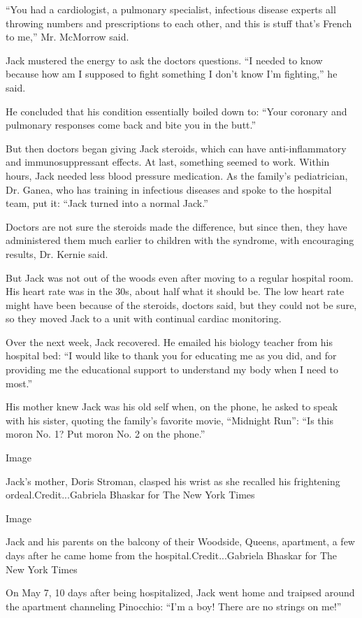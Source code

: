 ``You had a cardiologist, a pulmonary specialist, infectious disease
experts all throwing numbers and prescriptions to each other, and this
is stuff that's French to me,'' Mr. McMorrow said.

Jack mustered the energy to ask the doctors questions. ``I needed to
know because how am I supposed to fight something I don't know I'm
fighting,'' he said.

He concluded that his condition essentially boiled down to: ``Your
coronary and pulmonary responses come back and bite you in the butt.''

But then doctors began giving Jack steroids, which can have
anti-inflammatory and immunosuppressant effects. At last, something
seemed to work. Within hours, Jack needed less blood pressure
medication. As the family's pediatrician, Dr. Ganea, who has training in
infectious diseases and spoke to the hospital team, put it: ``Jack
turned into a normal Jack.''

Doctors are not sure the steroids made the difference, but since then,
they have administered them much earlier to children with the syndrome,
with encouraging results, Dr. Kernie said.

But Jack was not out of the woods even after moving to a regular
hospital room. His heart rate was in the 30s, about half what it should
be. The low heart rate might have been because of the steroids, doctors
said, but they could not be sure, so they moved Jack to a unit with
continual cardiac monitoring.

Over the next week, Jack recovered. He emailed his biology teacher from
his hospital bed: ``I would like to thank you for educating me as you
did, and for providing me the educational support to understand my body
when I need to most.''

His mother knew Jack was his old self when, on the phone, he asked to
speak with his sister, quoting the family's favorite movie, ``Midnight
Run'': ``Is this moron No. 1? Put moron No. 2 on the phone.''

Image

Jack's mother, Doris Stroman, clasped his wrist as she recalled his
frightening ordeal.Credit...Gabriela Bhaskar for The New York Times

Image

Jack and his parents on the balcony of their Woodside, Queens,
apartment, a few days after he came home from the
hospital.Credit...Gabriela Bhaskar for The New York Times

On May 7, 10 days after being hospitalized, Jack went home and traipsed
around the apartment channeling Pinocchio: ``I'm a boy! There are no
strings on me!''

